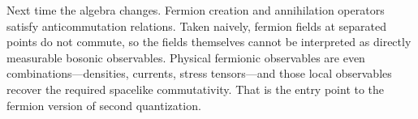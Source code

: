 \begin{classroomqa}
\end{classroomqa}

Next time the algebra changes. Fermion creation and annihilation operators satisfy anticommutation relations. Taken naively, fermion fields at separated points do not commute, so the fields themselves cannot be interpreted as directly measurable bosonic observables. Physical fermionic observables are even combinations---densities, currents, stress tensors---and those local observables recover the required spacelike commutativity. That is the entry point to the fermion version of second quantization.
